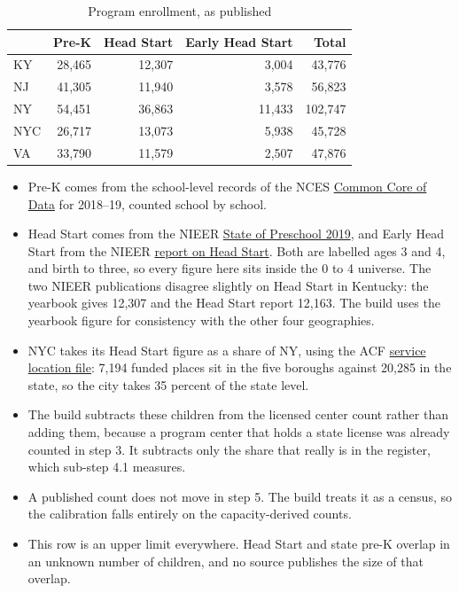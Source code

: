 \documentclass[11pt]{article}
\begin{document}
\begin{table}[H]
\centering
\caption{Program enrollment, as published}
\begin{tabular}{L{1.6cm}rrrr}
\toprule
& \textbf{Pre-K} & \textbf{Head Start} & \textbf{Early Head Start} & \textbf{Total} \\
\midrule
KY  & 28,465 & 12,307 &  3,004 &  43,776 \\
NJ  & 41,305 & 11,940 &  3,578 &  56,823 \\
NY  & 54,451 & 36,863 & 11,433 & 102,747 \\
NYC & 26,717 & 13,073 &  5,938 &  45,728 \\
VA  & 33,790 & 11,579 &  2,507 &  47,876 \\
\bottomrule
\end{tabular}
\end{table}

\begin{itemize}
\setlength{\itemsep}{0.45em}
\item Pre-K comes from the school-level records of the NCES
      \href{https://nces.ed.gov/ccd/Data/zip/ccd_sch_052_1819_l_1a_091019.zip}{Common
      Core of Data} for 2018--19, counted school by school.
\item Head Start comes from the NIEER
      \href{https://nieer.org/state-preschool-yearbook-2019}{State of Preschool
      2019}, and Early Head Start from the NIEER
      \href{https://nieer.org/sites/default/files/2023-10/hs_fullreport.pdf}{report
      on Head Start}. Both are labelled ages 3 and 4, and birth to three, so
      every figure here sits inside the 0 to 4 universe. The two NIEER
      publications disagree slightly on Head Start in Kentucky: the yearbook
      gives 12,307 and the Head Start report 12,163. The build uses the yearbook
      figure for consistency with the other four geographies.
\item NYC takes its Head Start figure as a share of NY, using the ACF
      \href{https://s3foa.s3.us-east-1.amazonaws.com/HS_Service_Locations.csv}{service
      location file}: 7,194 funded places sit in the five boroughs against
      20,285 in the state, so the city takes 35 percent of the state level.
\item The build subtracts these children from the licensed center count rather
      than adding them, because a program center that holds a state license was
      already counted in step 3. It subtracts only the share that really is in
      the register, which sub-step 4.1 measures.
\item A published count does not move in step 5. The build treats it as a
      census, so the calibration falls entirely on the capacity-derived counts.
\item This row is an upper limit everywhere. Head Start and state pre-K overlap
      in an unknown number of children, and no source publishes the size of that
      overlap.
\end{itemize}
\end{document}
